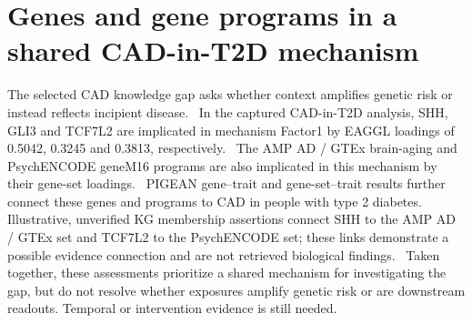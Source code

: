 \documentclass[11pt]{article}
\begin{document}
\section*{Genes and gene programs in a shared CAD-in-T2D mechanism}
The selected CAD knowledge gap asks whether context amplifies genetic risk or instead reflects incipient disease.~\cite{dapper:KnowledgeGap.zNV20nhHamt-a4CeAktQQPoAivOJe6xk} In the captured CAD-in-T2D analysis, SHH, GLI3 and TCF7L2 are implicated in mechanism Factor1 by EAGGL loadings of 0.5042, 0.3245 and 0.3813, respectively.~\cite{dapper:Claim.TsqJgibQNjkHLCocO-AIKxiPUgi3o5km,dapper:Claim.Uv7_cT46DdsqZMvk5nh8G48qOIKvhRgc,dapper:Claim.I2mf6PJ0DPF5_nnbiBjAhgjlUCOiUZZ9} The AMP AD / GTEx brain-aging and PsychENCODE geneM16 programs are also implicated in this mechanism by their gene-set loadings.~\cite{dapper:Claim.Kd3psmdr4G9AlD0UU1E1Vu6AjpKaQYWE,dapper:Claim.NBafdtdEE2Uabs-8pZqurv7SoWpg7Yhi} PIGEAN gene--trait and gene-set--trait results further connect these genes and programs to CAD in people with type 2 diabetes.~\cite{dapper:Claim.Oe2UZeV7oMY4NsMHyB8h4HJO1FH4nSGF,dapper:Claim.2idJniYU4zCtCN6puy8XZ2mzo9Mq6c5p,dapper:Claim.H5icBYm5JLM3_T-b1mMfH65Nc0zMhZzH,dapper:Claim.xzV_35EYnLl-zy03YbmhfBk_ynNbl7H9,dapper:Claim.SYqCJXxCVXDpwflRSdZnkVLzGLO_vi_r} Illustrative, unverified KG membership assertions connect SHH to the AMP AD / GTEx set and TCF7L2 to the PsychENCODE set; these links demonstrate a possible evidence connection and are not retrieved biological findings.~\cite{dapper:Claim.x7aCVQ1uTkYKLJo32ZyAGMGZaAGCSvWV,dapper:Claim.uzqyfwuhf59hSTdravdcr4cTxuitWGx-} Taken together, these assessments prioritize a shared mechanism for investigating the gap, but do not resolve whether exposures amplify genetic risk or are downstream readouts. Temporal or intervention evidence is still needed.~\cite{dapper:KnowledgeGap.zNV20nhHamt-a4CeAktQQPoAivOJe6xk,dapper:Claim.TsqJgibQNjkHLCocO-AIKxiPUgi3o5km,dapper:Claim.Uv7_cT46DdsqZMvk5nh8G48qOIKvhRgc,dapper:Claim.I2mf6PJ0DPF5_nnbiBjAhgjlUCOiUZZ9,dapper:Claim.Kd3psmdr4G9AlD0UU1E1Vu6AjpKaQYWE,dapper:Claim.NBafdtdEE2Uabs-8pZqurv7SoWpg7Yhi}

\par{}


\end{document}
